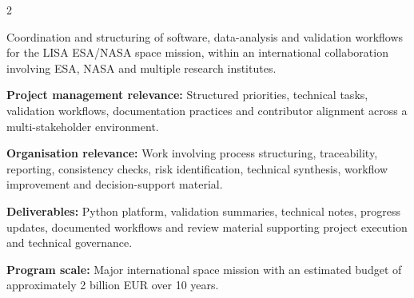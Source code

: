 \documentclass[8pt,a4paper,ragged2e,withhyper]{altacv}
\begin{document}
\begin{paracol}{2}

\divider
{}
\divider

\medskip



\divider


\divider


\divider


\end{paracol}




Coordination and structuring of software, data-analysis and validation workflows for the LISA ESA/NASA space mission, within an international collaboration involving ESA, NASA and multiple research institutes.

\textbf{Project management relevance:} Structured priorities, technical tasks, validation workflows, documentation practices and contributor alignment across a multi-stakeholder environment.

\textbf{Organisation relevance:} Work involving process structuring, traceability, reporting, consistency checks, risk identification, technical synthesis, workflow improvement and decision-support material.

\textbf{Deliverables:} Python platform, validation summaries, technical notes, progress updates, documented workflows and review material supporting project execution and technical governance.

\textbf{Program scale:} Major international space mission with an estimated budget of approximately 2 billion EUR over 10 years.

\divider

\end{document}
